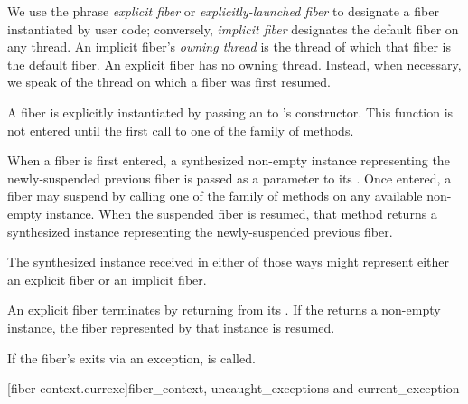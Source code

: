 We use the phrase \emph{explicit fiber} or \emph{explicitly-launched fiber} to
designate a fiber instantiated by user code; conversely, \emph{implicit fiber}
designates the default fiber on any thread. An implicit fiber's \emph{owning
thread} is the thread of which that fiber is the default fiber. An explicit
fiber has no owning thread. Instead, when necessary, we speak of the thread on
which a fiber was first resumed.

A fiber is explicitly instantiated by passing an \emph{\entryfn} to \fiber's
constructor. This function is not entered until the first call to one of
the  family of methods.

When a fiber is first entered, a synthesized non-empty \fiber instance
representing the newly-suspended previous fiber is passed as a parameter to
its \entryfn. Once entered, a fiber may suspend by calling one of the \resume
family of methods on any available non-empty \fiber instance. When the
suspended fiber is resumed, that method returns a synthesized \fiber instance
representing the newly-suspended previous fiber.

The synthesized \fiber instance received in either of those ways might
represent either an explicit fiber or an implicit fiber.

An explicit fiber terminates by returning from its \entryfn. If the \entryfn
returns a non-empty \fiber instance, the fiber represented by that \fiber
instance is resumed.



If the fiber's \entryfn exits via an exception,  is called.

[fiber-context.currexc]{fiber\_context, uncaught\_exceptions and current\_exception}



